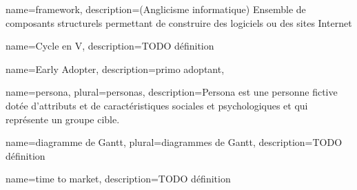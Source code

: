 
\begin{comment}
Glossaire : 
  Nouvelle entrée :
    \newglossaryentry{test} %
    {%
        name={test}, %
        description={<description>}, %
        plural={tests} %
    }
  Usage : 
    \gls{test} Retourne "test"
    \Gls{test} Retourne "Test"
    \glsplural{test} Retourne "tests"
    \Glsplural{test} Retourne "Tests"
        
Pour des mots utilisés fréquemment, petite astuce : 
	\newcommand{\bsr}{bilan scientifique régional} 
Ensuite, dans le contenu, il suffit d'y faire référence comme ceci : "\bsr{}"
\end{comment}


{%
    name={framework},
    description={(Anglicisme informatique) Ensemble de composants structurels permettant de construire des logiciels ou des sites Internet}
}

{%
	name={Cycle en V},
	description={TODO définition}
}

{%
	name={Early Adopter},
	description={primo adoptant},
}

{
	name={persona},
	plural={personas},
	description={Persona est une personne fictive dotée d'attributs et de caractéristiques sociales et psychologiques et qui représente un groupe cible. }
}

{
	name={diagramme de Gantt},
	plural={diagrammes de Gantt},
	description={TODO définition}
}

{
	name={time to market},
	description={TODO définition}
}





